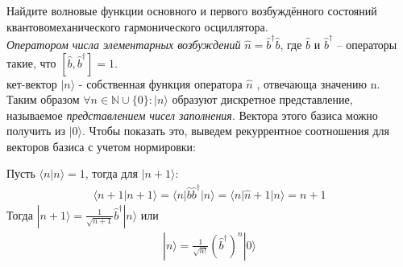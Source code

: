 \documentclass[__main__.tex]{subfiles}
\begin{document}
	
	Найдите волновые функции основного и первого возбуждённого состояний квантовомеханического гармонического осциллятора.\\ 
	
	\textit{Оператором числа элементарных возбуждений} $\hat{n}=\hat{b}^\dagger\hat{b}$, где $\hat{b}$ и $\hat{b}^\dagger$ -- операторы такие, что $[\hat{b},\hat{b}^\dagger]=1$.\\
	
	кет-вектор $|n\rangle$ - собственная функция оператора $\hat{n}$ , отвечающа значению n.\\
	
	Таким образом $\forall n\in\mathbb{N}\cup\{0\}\colon|n\rangle$ образуют дискретное представление, называемое \textit{представлением чисел заполнения}. Вектора этого базиса можно получить из $|0\rangle$. Чтобы показать это, выведем рекуррентное соотношения для векторов базиса с учетом нормировки:
	
	Пусть $\langle n|n\rangle=1$, тогда для $|n+1\rangle$:
	\begin{gather*}
		\langle n+1|n+1\rangle = \langle n|\hat{b}\hat{b}^\dagger|n\rangle = \langle n|\hat{n}+1|n\rangle
		= n+1
	\end{gather*}
	Тогда $|n+1\rangle = \frac{1}{\sqrt{n+1}}\hat{b}^\dagger|n\rangle$ или
	\begin{gather*}
		|n\rangle = \frac{1}{\sqrt{n!}}\left(\hat{b}^\dagger\right)^n|0\rangle
	\end{gather*}
	
\end{document}
